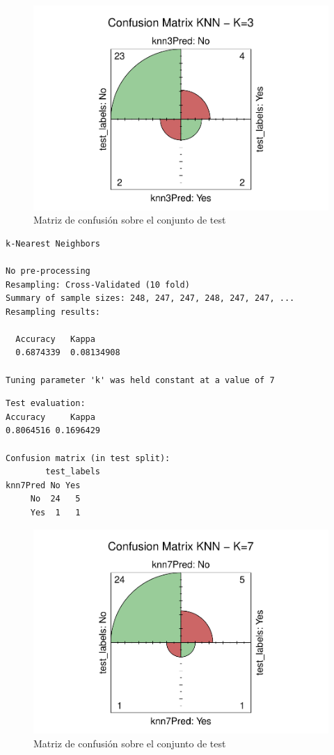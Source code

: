 \begin{figure}[H]\center\includegraphics[width=.9\linewidth]{img/Clasificacion_files/figure-latex/unnamed-chunk-12-1}\caption{Matriz de confusión sobre el conjunto de test}\end{figure}

\newpage

\begin{verbatim}
k-Nearest Neighbors 

No pre-processing
Resampling: Cross-Validated (10 fold) 
Summary of sample sizes: 248, 247, 247, 248, 247, 247, ... 
Resampling results:

  Accuracy   Kappa     
  0.6874339  0.08134908

Tuning parameter 'k' was held constant at a value of 7
\end{verbatim}

\begin{verbatim}
Test evaluation:
Accuracy     Kappa 
0.8064516 0.1696429 

Confusion matrix (in test split):
        test_labels
knn7Pred No Yes
     No  24   5
     Yes  1   1
\end{verbatim}

\begin{figure}[H]\center\includegraphics[width=.9\linewidth]{img/Clasificacion_files/figure-latex/unnamed-chunk-14-1}\caption{Matriz de confusión sobre el conjunto de test}\end{figure}

